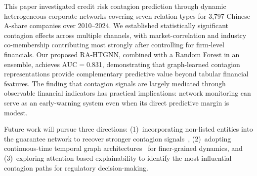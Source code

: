 \documentclass[3p,times,procedia]{elsarticle}
\begin{document}
This paper investigated credit risk contagion prediction through dynamic heterogeneous corporate networks covering seven relation types for 3{,}797 Chinese A-share companies over 2010--2024.
We established statistically significant contagion effects across multiple channels, with market-correlation and industry co-membership contributing most strongly after controlling for firm-level financials.
Our proposed RA-HTGNN, combined with a Random Forest in an ensemble, achieves AUC$=$0.831, demonstrating that graph-learned contagion representations provide complementary predictive value beyond tabular financial features.
The finding that contagion signals are largely mediated through observable financial indicators has practical implications: network monitoring can serve as an early-warning system even when its direct predictive margin is modest.

Future work will pursue three directions: (1)~incorporating non-listed entities into the guarantee network to recover stronger contagion signals~\cite{cheng2022contagion}, (2)~adopting continuous-time temporal graph architectures~\cite{rossi2020temporal} for finer-grained dynamics, and (3)~exploring attention-based explainability to identify the most influential contagion paths for regulatory decision-making.




\end{document}
